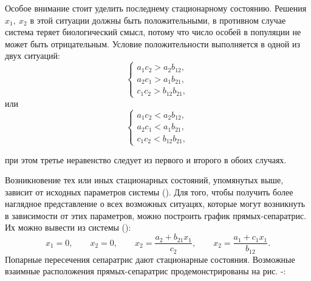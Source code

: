 \documentclass[12pt,a4paper]{article}
\begin{document}
    \vspace{1em}Особое внимание стоит уделить последнему стационарному состоянию. Решения $ x_1,\ x_2 $ в этой ситуации должны быть положительными, в противном случае система теряет биологический смысл, потому что число особей в популяции не может быть отрицательным. Условие положительности выполняется в одной из двух ситуаций: 
    \begin{equation}
        \label{positive}
        \begin{cases}
            a_1 c_2 > a_2 b_{12},
            \\
            a_2 c_1 > a_1 b_{21},
            \\
            c_1 c_2 > b_{12} b_{21},
        \end{cases}
    \end{equation}
    \noindent или
    \begin{equation}
        \label{negative}
        \begin{cases}
            a_1 c_2 < a_2 b_{12},
            \\
            a_2 c_1 < a_1 b_{21},
            \\
            c_1 c_2 < b_{12} b_{21},
        \end{cases}
    \end{equation}

    \noindent при этом третье неравенство следует из первого и второго в обоих случаях.

    Возникновение тех или иных стационарных состояний, упомянутых выше, зависит от исходных параметров системы (). Для того, чтобы получить более наглядное представление о всех возможных ситуацях, которые могут возникнуть в зависимости от этих параметров, можно построить график \linebreak прямых-сепаратрис. Их можно вывести из системы ():
    \begin{equation}
        \label{nullclines}
            x_1 = 0,\qquad 
            x_2 = 0,\qquad
            x_2 = \dfrac{a_2 + b_{21} x_1}{c_2},\qquad 
            x_2 = \dfrac{a_1 + c_1 x_1}{b_{12}}.
    \end{equation}
    Попарные пересечения сепаратрис дают стационарные состояния. Возможные взаимные расположения прямых-сепаратрис продемонстрированы на рис. -:
  
\end{document}
